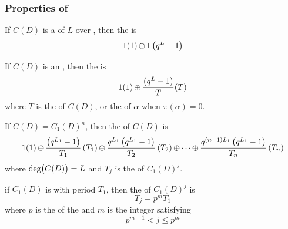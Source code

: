 \subsubsection{Properties of }\label{subsubsec:Cycle_Set_Properties}
\begin{propertylist}
\item If $C(D)$ is a  of  $L$ over , then the  is\label{prop:Cycle_Set_Properties-Primitive_Polynomial}
  \begin{equation}\label{eq:Primitive_Polynomial_Cycle_Set}
    1(1) \operatorname{\oplus} 1 \left( q^{L}-1 \right)
  \end{equation}
\item If $C(D)$ is an  , then the  is\label{prop:Cycle_Set_Properties-Irreducible_Polynomial}
  \begin{equation}\label{eq:Irreducible_Polynomial_Cycle_Set}
    1(1) \operatorname{\oplus} \frac{ \left(q^{L} - 1 \right)}{T} (T)
  \end{equation}
  where $T$ is the  of $C(D)$, or the  of $\alpha$ when $\pi(\alpha)=0$.
\end{propertylist}

\begin{theorem}\label{thm:Cycle_Set_Multiple_of_Connection_Polynomial}
  If $C(D) = {C_{1}(D)}^{n}$, then the  of $C(D)$ is
  \begin{equation}\label{eq:Cycle_Set_Multiple_of_Connection_Polynomial}
    1(1) \operatorname{\oplus} \frac{\left( q^{L_{1}}-1 \right)}{T_{1}} \left( T_{1} \right) \operatorname{\oplus} \frac{q^{L_{1}} \left( q^{L_{1}}-1 \right)}{T_{2}} \left( T_{2} \right) \operatorname{\oplus} \cdots \operatorname{\oplus} \frac{q^{(n-1)L_{1}}\left( q^{L_{1}}-1 \right)}{T_{n}} \left( T_{n} \right)
  \end{equation}
  where $\operatorname{\operatorname{deg}} \bigl( C(D) \bigr) = L$ and $T_{j}$ is the  of ${C_{1}(D)}^{j}$.
\end{theorem}

\begin{theorem}\label{thm:Irreducible_Connection_Polynomial_Multiple_Cycle_Set}
  if $C_{1}(D)$ is  with period $T_{1}$, then the  of ${C_{1}(D)}^{j}$ is
  \begin{equation}\label{eq:Irreducible_Connection_Polynomial_Multiple_Cycle_Set}
    T_{j} = p^{m}T_{1}
  \end{equation}
  where $p$ is the  of the  and $m$ is the integer satisfying
  \begin{equation}\label{eq:Irreducible_Connection_Polynomial_Multiple_Cycle_Set_Requirement}
    p^{m-1} < j \leq p^{m}
  \end{equation}
\end{theorem}

